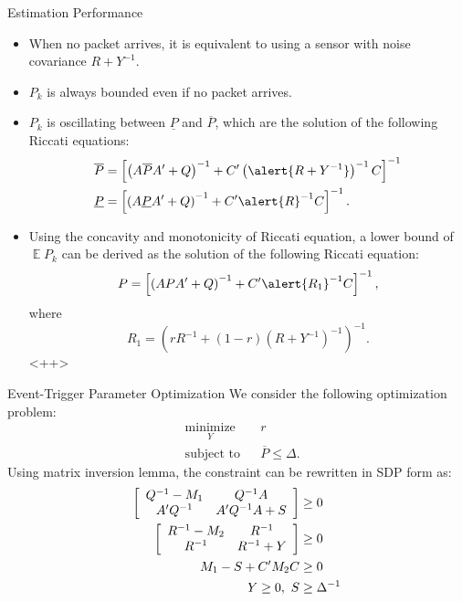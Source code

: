 \documentclass[10pt]{beamer}
\DeclareMathOperator{\E}{\mathbb E}
\begin{document}
  \begin{frame}{Estimation Performance}
    \begin{itemize}
      \item When no packet arrives, it is equivalent to using a sensor with noise covariance $R + Y^{-1}$.
      \item $P_k$ is always bounded even if no packet arrives. 
      \item $P_k$ is oscillating between $\underline P$ and $\overline P$, which are the solution of the following Riccati equations:
	\begin{displaymath}
	  \begin{split}
	    \overline P &= \left[\left(A\overline PA' + Q\right)^{-1} + C'\left( \alert{R+Y^{-1} }\right)^{-1}C\right]^{-1}\\
	    \underline P &= \left[\left(A\underline PA' + Q\right)^{-1} + C'\alert{R}^{-1}C\right]^{-1}.
	  \end{split}
	\end{displaymath}
      \item Using the concavity and monotonicity of Riccati equation, a lower bound of $\E P_k$ can be derived as the solution of the following Riccati equation:
	\begin{displaymath}
	    P= \left[\left(A PA' + Q\right)^{-1} + C' \alert{R_1}^{-1}C\right]^{-1},
	\end{displaymath}
	where
	\begin{displaymath}
	  R_1 = \left( rR^{-1} + (1-r)(R+Y^{-1})^{-1} \right)^{-1}.
	\end{displaymath}<++>
    \end{itemize}
  \end{frame}

  \begin{frame}{Event-Trigger Parameter Optimization}
    We consider the following optimization problem:
    \begin{align*}
      &\mathop{\textrm{minimize}}\limits_{Y}&
      & r\nonumber\\
      &\textrm{subject to}&
      & \overline P\leq \Delta.
    \end{align*}
    Using matrix inversion lemma, the constraint can be rewritten in SDP form as:
    \begin{align*}
      \left[ {\begin{array}{*{5}c}
	Q^{-1}-M_1  &  Q^{-1}A\\
	A^{\prime}Q^{-1} & A^{\prime}Q^{-1}A + S
      \end{array}} \right] &\ge 0 \nonumber
      \\
      \left[ {\begin{array}{*{5}c}
	R^{-1}-M_2  &  R^{-1}\\
	R^{-1} & R^{-1}+Y
      \end{array}} \right] &\ge 0 \nonumber
      \\ M_1 - S + C^{\prime}M_2C &\ge 0 \nonumber \\
      Y \ge 0, ~ S &\ge \Delta^{-1}
    \end{align*}
  \end{frame}
\end{document}
